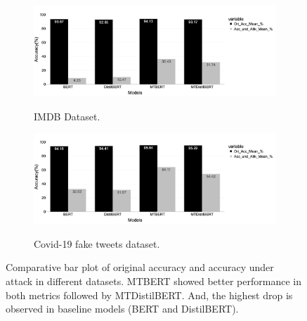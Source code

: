 \documentclass[%
	BCOR=8mm, %
	DIV=12,
	toc=bibliography, %
	toc=listof, %
	oneside, %
	egregdoesnotlikesansseriftitles, %
	]{scrbook}
\begin{document}
\begin{figure}[H]
    \centering
    \hspace*{2.9em}
    \begin{subfigure}
            \centering
            \includegraphics[width=.90\linewidth]{img/MOAandAUA_Imdb.png}
            \caption{IMDB Dataset.}{}
               \label{fig:}
        \end{subfigure}
    \begin{subfigure}
            \centering
            \hspace*{2.9em}
            \includegraphics[width=.90\linewidth]{img/MOAandAUA_fknews}
            \caption{Covid-19 fake tweets dataset.}{}
              \label{fig:sub2}
        \end{subfigure}
 \caption[Comparative bar plot between original accuracy and accuracy under attack]{\small Comparative bar plot of original accuracy and accuracy under attack in different datasets. MTBERT showed better performance in both metrics followed by MTDistilBERT. And, the highest drop is observed in baseline models (BERT and DistilBERT).}
  \label{fig:moaandauaimdb}
\end{figure}
\end{document}
